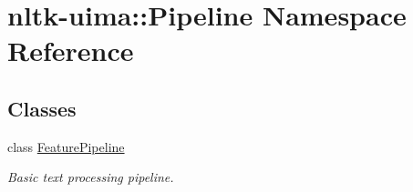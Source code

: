 \hypertarget{namespacenltk-uima_1_1Pipeline}{\section{nltk-\/uima\-:\-:\-Pipeline \-Namespace \-Reference}
\label{namespacenltk-uima_1_1Pipeline}
}
\subsection*{\-Classes}
\begin{DoxyCompactItemize}
\item 
class \hyperlink{classnltk-uima_1_1Pipeline_1_1FeaturePipeline}{\-Feature\-Pipeline}
\begin{DoxyCompactList}\small\item\em \-Basic text processing pipeline. \end{DoxyCompactList}\end{DoxyCompactItemize}
